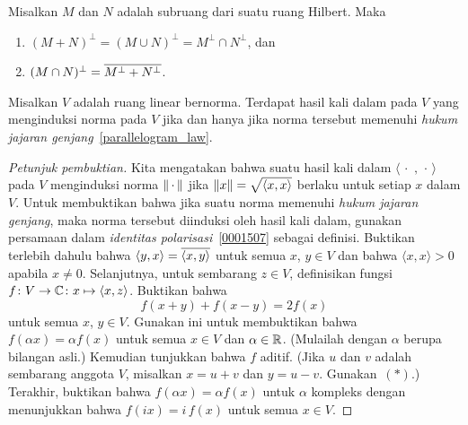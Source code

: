 \begin{prop} Misalkan $M$ dan $N$ adalah subruang dari suatu ruang Hilbert.  Maka
 \begin{enumerate}
  \item  $(M + N)^\perp = (M \cup N)^\perp =  M^\perp \cap N^\perp$, dan
  \item  $(M \cap N)^\perp = \overline{M^\perp + N^\perp}$.
 \end{enumerate}
\end{prop}

\begin{prop} Misalkan $V$ adalah ruang linear bernorma.  Terdapat hasil kali dalam pada $V$ yang menginduksi norma pada $V$
jika dan hanya jika norma tersebut memenuhi \emph{hukum jajaran genjang}~\ref{parallelogram_law}.
\end{prop}

\begin{proof}[\emph{Petunjuk pembuktian}]  Kita mengatakan bahwa suatu hasil kali dalam $\langle \,\cdot\,\,,\,\cdot\, \rangle$
pada $V$ menginduksi norma $\lVert\,\cdot\,\rVert$ jika $\lVert x\rVert = \sqrt{\langle x,x \rangle}$ berlaku untuk setiap $x$ dalam $V$.
Untuk membuktikan bahwa jika suatu norma memenuhi \emph{hukum jajaran genjang}, maka norma tersebut diinduksi oleh hasil kali dalam,
gunakan persamaan dalam \emph{identitas polarisasi}~\ref{0001507} sebagai definisi.
Buktikan terlebih dahulu bahwa $\langle y,x \rangle = \overline{\langle x,y \rangle}$ untuk semua $x$, $y\in V$ dan bahwa
$\langle x,x \rangle > 0$ apabila $x \ne 0$.  Selanjutnya, untuk sembarang $z \in V$, definisikan fungsi
$f\colon V \rightarrow \mathbb{C}\colon x \mapsto \langle x,z \rangle$.  Buktikan bahwa
   \[ f(x + y) + f(x - y) = 2f(x) \tag{$\ast$} \]
untuk semua $x$, $y \in V$.  Gunakan ini untuk membuktikan bahwa $f(\alpha x) = \alpha f(x)$ untuk semua
$x \in V$ dan $\alpha \in \mathbb{R}$.  (Mulailah dengan $\alpha$ berupa bilangan asli.)  Kemudian
tunjukkan bahwa $f$ aditif. (Jika $u$ dan $v$ adalah sembarang anggota $V$, misalkan $x = u + v$
dan $y = u - v$.  Gunakan~$(\ast)$.)  Terakhir, buktikan bahwa $f(\alpha x) = \alpha f(x)$ untuk
$\alpha$ kompleks dengan menunjukkan bahwa $f(ix) = i\,f(x)$ untuk semua $x \in V$.  \ns
\end{proof}
















